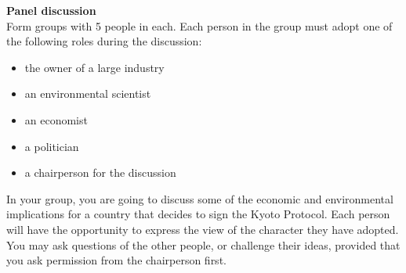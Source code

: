 {\textbf{Panel discussion}\\

Form groups with 5 people in each. Each person in the group must adopt one of the following roles during the discussion:
\begin{itemize}
\item{the owner of a large industry}
\item{an environmental scientist}
\item{an economist}
\item{a politician}
\item{a chairperson for the discussion}
\end{itemize}

In your group, you are going to discuss some of the economic and environmental implications for a country that decides to  sign the Kyoto Protocol. Each person will have the opportunity to express the view of the character they have adopted. You may ask questions of the other people, or challenge their ideas, provided that you ask permission from the chairperson first.
}



